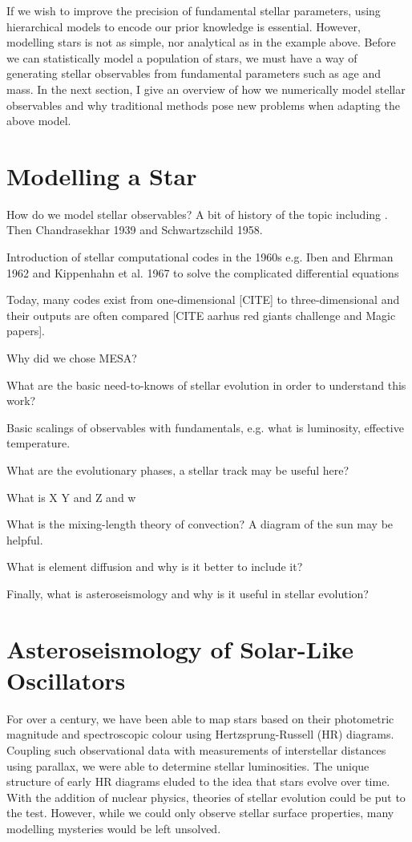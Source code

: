 If we wish to improve the precision of fundamental stellar parameters, using hierarchical models to encode our prior knowledge is essential. However, modelling stars is not as simple, nor analytical as in the example above. Before we can statistically model a population of stars, we must have a way of generating stellar observables from fundamental parameters such as age and mass. In the next section, I give an overview of how we numerically model stellar observables and why traditional methods pose new problems when adapting the above model.

\section{Modelling a Star}

How do we model stellar observables? A bit of history of the topic including \citet{Eddington1926}. Then Chandrasekhar 1939 and Schwartzschild 1958.

Introduction of stellar computational codes in the 1960s e.g. Iben and Ehrman 1962 and Kippenhahn et al. 1967 to solve the complicated differential equations

Today, many codes exist from one-dimensional [CITE] to three-dimensional and their outputs are often compared [CITE aarhus red giants challenge and Magic papers].

Why did we chose MESA? 

What are the basic need-to-knows of stellar evolution in order to understand this work?

Basic scalings of observables with fundamentals, e.g. what is luminosity, effective temperature. 

What are the evolutionary phases, a stellar track may be useful here?

What is X Y and Z and w

What is the mixing-length theory of convection? A diagram of the sun may be helpful.

What is element diffusion and why is it better to include it?

Finally, what is asteroseismology and why is it useful in stellar evolution?

\section{Asteroseismology of Solar-Like Oscillators}

For over a century, we have been able to map stars based on their photometric magnitude and spectroscopic colour using Hertzsprung-Russell (HR) diagrams. Coupling such observational data with measurements of interstellar distances using parallax, we were able to determine stellar luminosities. The unique structure of early HR diagrams eluded to the idea that stars evolve over time. With the addition of nuclear physics, theories of stellar evolution could be put to the test. However, while we could only observe stellar surface properties, many modelling mysteries would be left unsolved.

